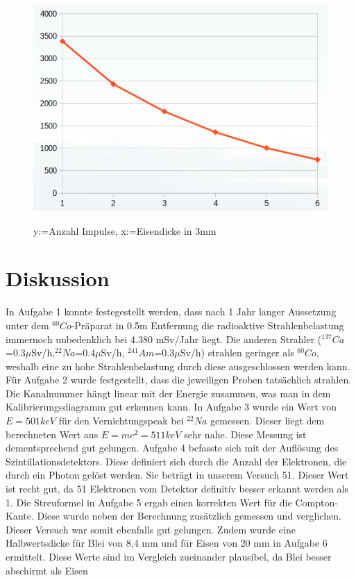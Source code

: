 \documentclass[11pt,a4paper]{article}
\begin{document}
    \begin{figure}
       \caption{y:=Anzahl Impulse, x:=Eisendicke in 3mm}
       \centering
       \includegraphics[scale=0.5]{Bilder/blei.png} \\
   \end{figure}
 \section{Diskussion}
  In Aufgabe 1 konnte festegestellt werden, dass nach 1 Jahr langer Aussetzung unter dem $^{60}{Co}$-Präparat in 0.5m Entfernung die radioaktive Strahlenbelastung immernoch unbedenklich bei 4.380 mSv/Jahr liegt. Die anderen Strahler ($^{137}{Ca}$=0.3$\mu$Sv/h,$^{22}{Na}$=0.4$\mu$Sv/h, $^{241}{Am}$=0.3$\mu$Sv/h) strahlen geringer als
   $^{60}{Co}$, weshalb eine zu hohe Strahlenbelastung durch diese ausgeschlossen werden kann.
  Für Aufgabe 2 wurde festgestellt, dass die jeweiligen Proben tats\"achlich strahlen. Die Kanalnummer hängt linear mit der Energie zusammen, was man in dem Kalibrierungsdiagramm gut erkennen kann.
  In Aufgabe 3 wurde ein Wert von $E = 501keV$ für den Vernichtungspeak bei $^{22}{Na}$ gemessen. Dieser liegt dem berechneten Wert aus $E = mc^2= 511keV$ sehr nahe. Diese Messung ist dementsprechend gut gelungen.
  Aufgabe 4 befasste sich mit der Auflösung des Szintillationsdetektors. Diese definiert sich durch die Anzahl der Elektronen, die durch ein Photon gelöst werden. Sie beträgt in unserem Versuch 51. Dieser Wert ist recht gut, da 51 Elektronen vom Detektor definitiv besser erkannt werden als 1.
  Die Streuformel in Aufgabe 5 ergab einen korrekten Wert für die Compton-Kante. Diese wurde neben der Berechnung zusätzlich gemessen und verglichen. Dieser Versuch war somit ebenfalls gut gelungen.
   Zudem wurde eine Halbwertsdicke f\"ur Blei von 8,4 mm und f\"ur Eisen von 20 mm in Aufgabe 6 ermittelt. Diese Werte sind im Vergleich zueinander plausibel, da Blei besser abschirmt als Eisen
  
\end{document}
